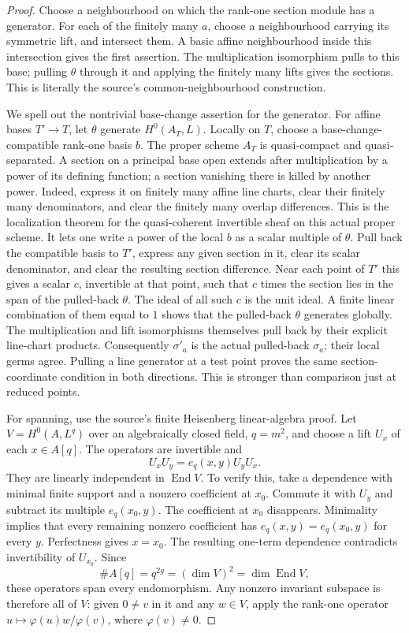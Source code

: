 \begin{proof}
Choose a neighbourhood on which the rank-one section
module has a generator.
For each of the finitely many \(a\), choose a
neighbourhood carrying its symmetric lift, and
intersect them.
A basic affine neighbourhood inside this intersection
gives the first assertion.
The multiplication isomorphism pulls to this base;
pulling \(\theta\) through it and applying the finitely
many lifts gives the sections.
This is literally the source's common-neighbourhood
construction.

We spell out the nontrivial base-change assertion for
the generator.
For affine bases \(T'\to T\), let \(\theta\) generate
\(H^0(A_T,L)\).
Locally on \(T\), choose a base-change-compatible
rank-one basis \(b\).
The proper scheme \(A_T\) is quasi-compact and
quasi-separated.
A section on a principal base open extends after
multiplication by a power of its defining function;
a section vanishing there is killed by another power.
Indeed, express it on finitely many affine line charts,
clear their finitely many denominators, and clear the
finitely many overlap differences.
This is the localization theorem for the quasi-coherent
invertible sheaf on this actual proper scheme.
It lets one write a power of the local \(b\) as a scalar
multiple of \(\theta\).
Pull back the compatible basis to \(T'\), express any
given section in it, clear its scalar denominator,
and clear the resulting section difference.
Near each point of \(T'\) this gives a scalar \(c\),
invertible at that point, such that \(c\) times the
section lies in the span of the pulled-back \(\theta\).
The ideal of all such \(c\) is the unit ideal.
A finite linear combination of them equal to \(1\)
shows that the pulled-back \(\theta\) generates globally.
The multiplication and lift isomorphisms themselves
pull back by their explicit line-chart products.
Consequently \(\sigma'_a\) is the actual pulled-back
\(\sigma_a\); their local germs agree.
Pulling a line generator at a test point proves the
same section-coordinate condition in both directions.
This is stronger than comparison just at reduced points.

For spanning, use the source's finite Heisenberg
linear-algebra proof.
Let \(V=H^0(A,L^q)\) over an algebraically closed field,
\(q=m^2\), and choose a lift \(U_x\) of each \(x\in A[q]\).
The operators are invertible and
\[
                         U_xU_y=e_q(x,y)U_yU_x .
 \tag{TE6}\label{eq:ftb-heisenberg-operators}
\]
They are linearly independent in \(\operatorname{End}V\).
To verify this, take a dependence with minimal finite
support and a nonzero coefficient at \(x_0\).
Commute it with \(U_y\) and subtract its multiple
\(e_q(x_0,y)\).
The coefficient at \(x_0\) disappears.
Minimality implies that every remaining nonzero
coefficient has
\(e_q(x,y)=e_q(x_0,y)\) for every \(y\).
Perfectness gives \(x=x_0\).
The resulting one-term dependence contradicts
invertibility of \(U_{x_0}\).
Since
\[
            \#A[q]=q^{2g}=(\dim V)^2=\dim\operatorname{End}V,
\]
these operators span every endomorphism.
Any nonzero invariant subspace is therefore all of \(V\):
given \(0\ne v\) in it and any \(w\in V\), apply the
rank-one operator \(u\mapsto\varphi(u)w/\varphi(v)\),
where \(\varphi(v)\ne0\).


\end{proof}
